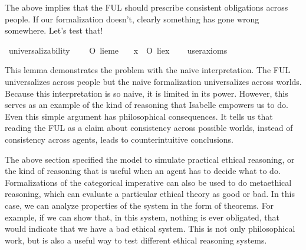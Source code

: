 \begin{isabellebody}
\begin{isamarkuptext}
The above implies that the FUL should prescribe consistent obligations across people. If our formalization
doesn't, clearly something has gone wrong somewhere. Let's test that!%
\end{isamarkuptext}\isamarkuptrue%
\isamarkupfalse%
\ universalizability{\isacharcolon}\isanewline
\ \ \ {\isachardoublequoteopen}{\isasymTurnstile}\ O\ {\isacharbraceleft}{\isacharparenleft}lie{\isacharparenleft}me{\isacharparenright}{\isacharparenright}{\isacharbraceright}{\isachardoublequoteclose}\isanewline
\ \ \ {\isachardoublequoteopen}{\isasymforall}x{\isachardot}\ {\isasymTurnstile}\ {\isacharparenleft}O\ {\isacharbraceleft}{\isacharparenleft}lie{\isacharparenleft}x{\isacharparenright}{\isacharparenright}{\isacharbraceright}{\isacharparenright}{\isachardoublequoteclose}\isanewline
\ \ \isamarkupfalse%
\ {\isacharbrackleft}user{\isacharunderscore}axioms{\isacharbrackright}%
\isadelimproof
\ %
\endisadelimproof
%
\isatagproof
{}\isamarkupfalse%
\isanewline
%
%
\endisatagproof
{\isafoldproof}%
%
\isadelimproof
%
\endisadelimproof
%
\begin{isamarkuptext}%
This lemma demonstrates the problem with the naive interpretation. The FUL universalizes across people
but the naive formalization universalizes across worlds. Because this interpretation is so naive, it is 
limited in its power. However, this serves as an example of the kind of reasoning that 
Isabelle empowers us to do. Even this simple argument has philosophical consequences. It tells us that
reading the FUL as a claim about consistency across possible worlds, instead of consistency across 
agents, leads to counterintuitive conclusions.%
\end{isamarkuptext}\isamarkuptrue%
%
\isadelimdocument
%
\endisadelimdocument
%
\isatagdocument
%
\isamarkuptrue%
%
\endisatagdocument
{\isafolddocument}%
%
\isadelimdocument
%
\endisadelimdocument
%
\begin{isamarkuptext}%
The above section specified the model to simulate practical ethical reasoning, or the kind of 
reasoning that is useful when an agent has to decide what to do. Formalizations of the categorical 
imperative can also be used to do metaethical reasoning, which can evaluate a particular ethical theory
as good or bad. In this case, we can analyze properties of the system in the form of theorems. For example,
if we can show that, in this system, nothing is ever obligated, that would indicate that we have a bad 
ethical system. This is not only philosophical work, but is also a useful way to test different ethical
reasoning systems.


\end{isamarkuptext}
\end{isabellebody}
